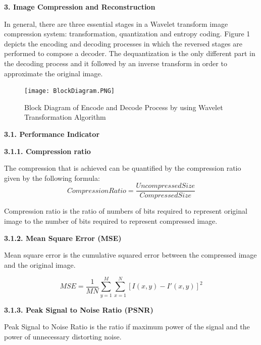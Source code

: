 \documentclass{article}
\begin{document}
\begin{flushleft}
\textbf{\large 3. Image Compression and Reconstruction}
\end{flushleft}

In general, there are three essential stages in a Wavelet transform image compression system: transformation, quantization and entropy coding. Figure 1 depicts the encoding and decoding processes in which the reversed stages are performed to compose a decoder. The dequantization is the only different part in the decoding process and it followed by an inverse transform in order to approximate the original image. 

\begin{figure}[htp]
    \centering
    \Large\texttt{[image: BlockDiagram.PNG]}
    \caption{Block Diagram of Encode and Decode Process by using Wavelet Transformation Algorithm}
    \label{fig:BlockDiagram}
\end{figure}


\begin{flushleft}
\textbf{\large 3.1. Performance Indicator }
\end{flushleft}

\begin{flushleft}
\textbf{3.1.1. Compression ratio}
\end{flushleft}

The compression that is achieved can be quantified by the compression ratio given by the following formula:
\[Compression Ratio = \frac{Uncompressed Size}{Compressed Size}\]

Compression ratio is the ratio of numbers of bits required to represent original image to the number of bits required to represent compressed image.

\begin{flushleft}
\textbf{3.1.2. Mean Square Error (MSE)}
\end{flushleft}

Mean square error is the cumulative squared error between the compressed image and the original image.

\[MSE = \frac{1}{MN}\sum_{y=1}^M \sum_{x=1}^N [I(x,y) - I'(x, y)]^2\]

\begin{flushleft}
\textbf{3.1.3. Peak Signal to Noise Ratio (PSNR)}
\end{flushleft}

Peak Signal to Noise Ratio is the ratio if maximum power of the signal and the power of unnecessary distorting noise.
\end{document}

